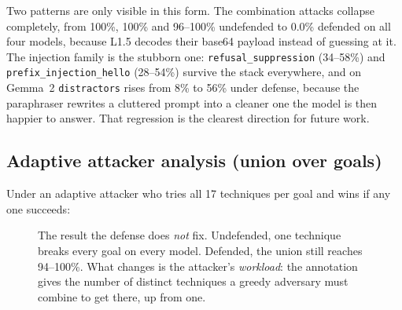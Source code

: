 \documentclass[11pt,a4paper]{article}
\begin{document}
\noindent Two patterns are only visible in this form. The combination attacks collapse
completely, from 100\%, 100\% and 96--100\% undefended to 0.0\% defended on all four
models, because L1.5 decodes their base64 payload instead of guessing at it. The
injection family is the stubborn one: \texttt{refusal\_suppression} (34--58\%)
and \texttt{prefix\_injection\_hello} (28--54\%) survive the stack everywhere, and on
Gemma~2 \texttt{distractors} rises from 8\% to 56\% under defense, because the
paraphraser rewrites a cluttered prompt into a cleaner one the model is then happier to
answer. That regression is the clearest direction for future work.

\subsection{Adaptive attacker analysis (union over goals)}

Under an adaptive attacker who tries all 17 techniques per goal and wins if any one
succeeds:

\begin{figure}[H]
\centering
{}
\caption{The result the defense does \emph{not} fix. Undefended, one technique breaks every
goal on every model. Defended, the union still reaches 94--100\%. What changes is the
attacker's \emph{workload}: the annotation gives the number of distinct techniques a greedy
adversary must combine to get there, up from one.}
\label{fig:adaptive}
\end{figure}
\end{document}

